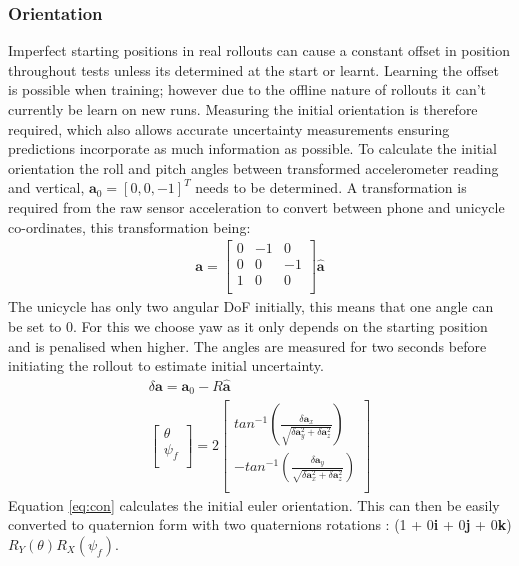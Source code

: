\documentclass[twoside,twocolumn,12pt]{article}
\begin{document}
\subsubsection{Orientation}
Imperfect starting positions in real rollouts can cause a constant offset in position throughout tests unless its determined at the start or learnt. Learning the offset is possible when training; however due to the offline nature of rollouts it can't currently be learn on new runs. Measuring the initial orientation is therefore required, which also allows accurate uncertainty measurements ensuring predictions incorporate as much information as possible.
\newline
To calculate the initial orientation the roll and pitch angles between transformed accelerometer reading and vertical, $\textbf{a}_0 = [0,0,-1]^T$ needs to be determined. A transformation is required from the raw sensor acceleration to convert between phone and unicycle co-ordinates, this transformation being:
\begin{align*}
\textbf{a} = \begin{bmatrix}
0 & -1 & 0 \\
0 & 0 & -1\\
1 & 0 & 0 \\
\end{bmatrix}
\hat{\textbf{a}}
\end{align*}
 The unicycle has only two angular DoF initially, this means that one angle can be set to 0. For this we choose yaw as it only depends on the starting position and is penalised when higher. The angles are measured for two seconds before initiating the rollout to estimate initial uncertainty.
\begin{equation}
\begin{gathered}
\delta\textbf{a} = \textbf{a}_0 - R\hat{\textbf{a}} \\
\begin{bmatrix}
\theta \\
\psi_f \\
\end{bmatrix} = 
2 \begin{bmatrix}
tan^{-1} ( \frac{\delta\textbf{a}_x}{\sqrt{\delta\textbf{a}_y^2+\delta\textbf{a}_z^2}} )\\
-tan^{-1} ( \frac{\delta\textbf{a}_y}{\sqrt{\delta\textbf{a}_x^2+\delta\textbf{a}_z^2}} )\\
\end{bmatrix}
\label{eq:con}
\end{gathered}
\end{equation}
Equation \ref{eq:con} calculates the initial euler orientation. This can then be easily converted to quaternion form with two quaternions rotations : (1 + 0\textbf{i}  + 0\textbf{j} + 0\textbf{k})$R_Y(\theta)R_X(\psi_f)$. 
\end{document}
